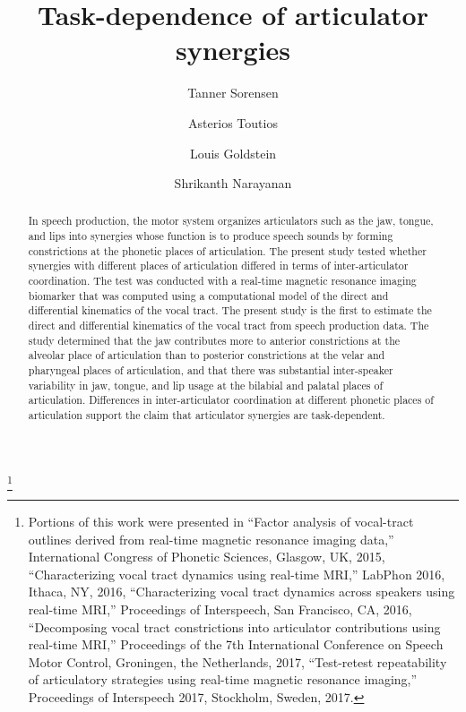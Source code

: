 \documentclass[preprint]{JASAnew}\usepackage[]{graphicx}\usepackage[]{color}
\begin{document}
\title[Task dependence of articulator synergies]{Task-dependence of articulator synergies}

\thanks{Portions of this work were presented in 
``Factor analysis of vocal-tract outlines derived from real-time magnetic resonance imaging data,'' International Congress of Phonetic Sciences, Glasgow, UK, 2015,
``Characterizing vocal tract dynamics using real-time MRI,'' LabPhon 2016, Ithaca, NY, 2016,
``Characterizing vocal tract dynamics across speakers using real-time MRI,'' Proceedings of Interspeech, San Francisco, CA, 2016, 
``Decomposing vocal tract constrictions into articulator contributions using real-time MRI,'' Proceedings of the 7th International Conference on Speech Motor Control, Groningen, the Netherlands, 2017,
``Test-retest repeatability of articulatory strategies using real-time magnetic resonance imaging,'' Proceedings of Interspeech 2017, Stockholm, Sweden, 2017.}

\author{Tanner Sorensen}

\author{Asterios Toutios}

\author{Louis Goldstein}

\author{Shrikanth Narayanan}

\begin{abstract}
In speech production, the motor system organizes articulators such as the jaw, tongue, and lips into synergies whose function is to produce speech sounds by forming constrictions at the phonetic places of articulation.
%
The present study tested whether synergies with different places of articulation differed in terms of inter-articulator coordination.
%
The test was conducted with a real-time magnetic resonance imaging biomarker that was computed using a computational model of the direct and differential kinematics of the vocal tract. 
%
The present study is the first to estimate the direct and differential kinematics of the vocal tract from speech production data.
%
The study determined that the jaw contributes more to anterior constrictions at the alveolar place of articulation than to posterior constrictions at the velar and pharyngeal places of articulation, and that there was substantial inter-speaker variability in jaw, tongue, and lip usage at the bilabial and palatal places of articulation. 
%
Differences in inter-articulator coordination at different phonetic places of articulation support the claim that articulator synergies are task-dependent.
\end{abstract}
\end{document}
